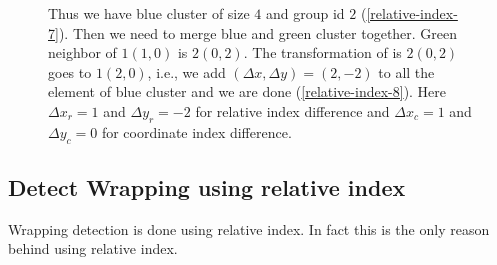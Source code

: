 \documentclass[10pt,a4paper]{report}
\begin{document}
\begin{figure}
	\centering
	\caption{ Thus we have blue cluster of size $4$ and group id $2$ (\ref{relative-index-7}).  Then we need to merge blue and green cluster together. Green neighbor of $1(1,0)$ is $2(0,2)$. The transformation of is $2(0,2)$ goes to $1(2,0)$, i.e., we add $(\Delta x, \Delta y)=(2,-2)$ to all the element of blue cluster and we are done (\ref{relative-index-8}). Here $\Delta x_r=1$ and $\Delta y_r=-2$ for relative index difference and $\Delta x_c=1$ and $\Delta y_c=0$ for coordinate index difference.}
	\label{fig:relative-index-3}
\end{figure}

\subsection{Detect Wrapping using relative index}
Wrapping detection is done using relative index. In fact this is the only reason behind using relative index.
\end{document}

